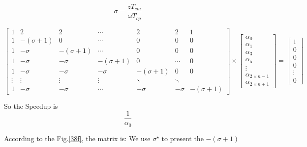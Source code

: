$$\sigma = \frac{zT_{cm}}{\omega T_{cp}}$$

\begin{equation}
{
\left[ \begin{array}{ccccccc}
1 & 2 & 2 & \cdots & 2 & 2 & 1\\
1 & -(\sigma + 1) & 0 & \cdots& 0 & 0 & 0\\
1 & -\sigma & -(\sigma + 1) & \cdots & 0 & 0 & 0 \\
1 & -\sigma & -\sigma & -(\sigma + 1) & 0 & \cdots & 0 \\
1 & -\sigma & -\sigma & -\sigma & -(\sigma + 1) & 0 & 0 \\
\vdots & \vdots & \vdots  &   \vdots & \ddots & \ddots\\
1 & -\sigma & -\sigma & \cdots & -\sigma & -\sigma & -(\sigma + 1)
\end{array} 
\right ]} \times \left[ \begin{array}{c}
\alpha_{0} \\
\alpha_{1} \\
\alpha_{3} \\
\alpha_{5} \\
\vdots \\
\alpha_{2 \times n - 1}\\
\alpha_{2 \times n + 1}
\end{array} 
\right ] = \left[ \begin{array}{c}
1 \\
0 \\
0 \\
0 \\
\vdots \\
0
\end{array} 
\right ]
\end{equation}

So the Speedup is $$\frac{1}{\alpha_{0}}$$

\vspace*{50pt}

According to the Fig.\ref{38f}, the matrix is:
We use ${\sigma}^{\star}$ to present the $-(\sigma + 1)$

